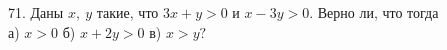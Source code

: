 71. Даны $x,\ y$ такие, что $3x+y>0$ и $x-3y>0.$ Верно ли, что тогда\\
а) $x>0$ б) $x+2y>0$ в) $x>y?$\\

